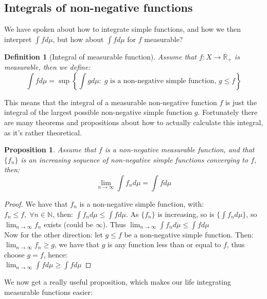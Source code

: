 \documentclass{article}
\newcommand{\N}{\mathbb{N}}
\newcommand{\Rbar}{\overline{\mathbb{R}}}%
\newtheorem{definition}{Definition}
\newtheorem{prop}{Proposition}
\newtheorem{proof}{Proof}
\begin{document}
\newpage
\subsection{Integrals of non-negative functions}
We have spoken about how to integrate simple functions, and how we then interpret $\int fd\mu$, but how about $\int fd\mu$ for $f$ measurable? 

\begin{definition}[Integral of measurable function]
\label{def: integral of measurable function}
Assume that $f:X\to \Rbar_{+}$ is measurable, then we define: 
\[\int f d\mu = \sup\left\{\int g d\mu: \; \text{$g$ is a non-negative simple function, $g\leq f$}\right\}
\]
\end{definition}

This means that the integral of a measurable non-negative function $f$ is just the integral of the largest possible non-negative simple function $g$. Fortunately there are many theorems and propositions about how to actually calculate this integral, as it's rather theoretical. 

\begin{prop}
\label{prop: increasing simple functions converging to f}
Assume that $f$ is a non-negative measurable function, and that $\{f_{n}\}$ is an increasing sequence of non-negative simple functions converging to $f$, then: 
\[\lim_{n\to \infty}\int f_{n}d\mu = \int f d\mu
\]
\end{prop}

\begin{proof}
We have that $f_{n}$ is a non-negative simple function, with:\\  $f_{n}\leq f, \; \forall n\in \N$, then: $\int f_{n}d\mu \leq \int fd\mu$. As $\{f_{n}\}$ is increasing, so is $\{\int f_{n}d\mu\}$, so $\lim_{n\to \infty}f_{n}$ exists (could be $\infty$). Thus $\lim_{n\to \infty}\int f_{n}d\mu \leq \int fd\mu$\\ 
Now for the other direction: let $g\leq f$ be a non-negative simple function. Then: $\lim_{n\to \infty}f_{n} \geq g$, we have that $g$ is any function less than or equal to $f$, thus choose $g=f$, hence: \\ 
$\lim_{n\to \infty}\int fd\mu \geq \int fd\mu$
\end{proof}  

We now get a really useful proposition, which makes our life integrating measurable functions easier: 
\end{document}
